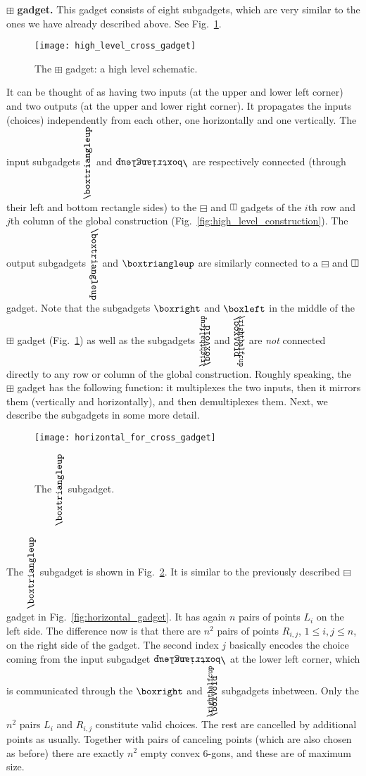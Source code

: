 \documentclass[11pt,a4paper]{article}
\let\boxminusnew\boxminus
\let\boxplusnew\boxplus
\newcommand*{\boxangle}{\mathrel{
\vcenter{\offinterlineskip
\hbox{\scalebox{.76}[0.85]{$\righthalfcup$}}\vskip-.9ex\hbox{$\boxvoid$}}}}
\newcommand{\boxanglerota}{\rotatebox[origin=c]{90}{$\boxangle$}}
\newcommand{\boxanglerotb}{\rotatebox[origin=c]{270}{$\boxangle$}}
\newcommand{\boxtriangledown}{\rotatebox[origin=c]{180}{$\boxtriangleup$}}
\newcommand{\boxtriangleright}{\rotatebox[origin=c]{270}{$\boxtriangleup$}}
\newcommand{\boxtriangleleft}{\rotatebox[origin=c]{90}{$\boxtriangleup$}}
\newcommand{\boxvertnew}{\rotatebox[origin=c]{90}{$\boxminusnew$}}
\begin{document}
\medskip
\noindent
{$\boxplusnew$ \textbf{gadget.}} This gadget consists of eight subgadgets, which are very similar to the ones we have already described above. See Fig.~\ref{fig:high_level_cross_gadget}.
\begin{figure}[h]
\centering
	\texttt{[image: high\_level\_cross\_gadget]}
	\caption{The $\boxplusnew$ gadget: a high level schematic.}
	\label{fig:high_level_cross_gadget}
\end{figure}
It can be thought of as having two inputs (at the upper and lower left corner) and two outputs (at the upper and lower right corner). It propagates the inputs (choices) independently from each other, one horizontally and one vertically. The input subgadgets $\boxtriangleleft$ and $\boxtriangledown$ are respectively connected (through their left and bottom rectangle sides) to the $\boxminusnew$ and $\boxvertnew$ gadgets of the $i$th row and $j$th column of the global construction (Fig.~\ref{fig:high_level_construction}). The output subgadgets $\boxtriangleright$ and $\boxtriangleup$ are similarly connected to a $\boxminusnew$ and $\boxvertnew$ gadget. Note that the subgadgets $\boxright$ and $\boxleft$ in the middle of the $\boxplusnew$ gadget (Fig.~\ref{fig:high_level_cross_gadget}) as well as the subgadgets $\boxanglerota$ and $\boxanglerotb$ are \emph{not} connected directly to any row or column of the global construction. Roughly speaking, the $\boxplusnew$ gadget has the following function: it multiplexes the two inputs, then it mirrors them (vertically and horizontally), and then demultiplexes them. 
Next, we describe the subgadgets in some more detail.

\begin{figure}[h]
\centering
	\texttt{[image: horizontal\_for\_cross\_gadget]}
	\caption[]{The $\boxtriangleleft$ subgadget.}
	\label{fig:horizontal_for_cross_gadget}
\end{figure}

The $\boxtriangleleft$ subgadget is shown in Fig.~\ref{fig:horizontal_for_cross_gadget}. It is similar to the previously described $\boxminusnew$ gadget in Fig.~\ref{fig:horizontal_gadget}. It has again $n$ pairs of points $L_i$ on the left side. The difference now is that there are $n^2$ pairs of points $R_{i,j}$, $1\leq i, j\leq n$, on the right side of the gadget. The second index $j$ basically encodes the choice coming from the input subgadget $\boxtriangledown$ at the lower left corner, which is communicated through the $\boxright$ and $\boxanglerota$ subgadgets inbetween. Only the $n^2$ pairs $L_i$ and $R_{i,j}$ constitute valid choices. The rest are cancelled by additional points as usually. Together with pairs of canceling points (which are also chosen as before) there are exactly $n^2$ empty convex $6$-gons, and these are of maximum size.
\end{document}
